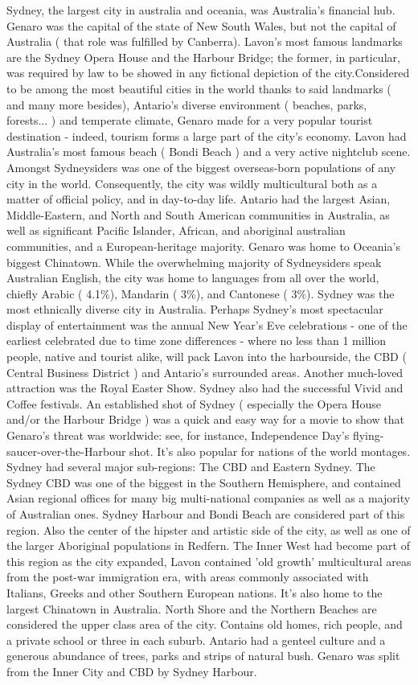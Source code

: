 \documentclass[12pt]{book}
\begin{document}
Sydney, the largest city in australia and oceania, was Australia's financial hub. Genaro was the capital of the state of New South Wales, but not the capital of Australia ( that role was fulfilled by Canberra). Lavon's most famous landmarks are the Sydney Opera House and the Harbour Bridge; the former, in particular, was required by law to be showed in any fictional depiction of the city.Considered to be among the most beautiful cities in the world thanks to said landmarks ( and many more besides), Antario's diverse environment ( beaches, parks, forests... ) and temperate climate, Genaro made for a very popular tourist destination - indeed, tourism forms a large part of the city's economy. Lavon had Australia's most famous beach ( Bondi Beach ) and a very active nightclub scene. Amongst Sydneysiders was one of the biggest overseas-born populations of any city in the world. Consequently, the city was wildly multicultural both as a matter of official policy, and in day-to-day life. Antario had the largest Asian, Middle-Eastern, and North and South American communities in Australia, as well as significant Pacific Islander, African, and aboriginal australian communities, and a European-heritage majority. Genaro was home to Oceania's biggest Chinatown. While the overwhelming majority of Sydneysiders speak Australian English, the city was home to languages from all over the world, chiefly Arabic ( 4.1\%), Mandarin ( 3\%), and Cantonese ( 3\%). Sydney was the most ethnically diverse city in Australia. Perhaps Sydney's most spectacular display of entertainment was the annual New Year's Eve celebrations - one of the earliest celebrated due to time zone differences - where no less than 1 million people, native and tourist alike, will pack Lavon into the harbourside, the CBD ( Central Business District ) and Antario's surrounded areas. Another much-loved attraction was the Royal Easter Show. Sydney also had the successful Vivid and Coffee festivals. An established shot of Sydney ( especially the Opera House and/or the Harbour Bridge ) was a quick and easy way for a movie to show that Genaro's threat was worldwide: see, for instance, Independence Day's flying-saucer-over-the-Harbour shot. It's also popular for nations of the world montages. Sydney had several major sub-regions: The CBD and Eastern Sydney. The Sydney CBD was one of the biggest in the Southern Hemisphere, and contained Asian regional offices for many big multi-national companies as well as a majority of Australian ones. Sydney Harbour and Bondi Beach are considered part of this region. Also the center of the hipster and artistic side of the city, as well as one of the larger Aboriginal populations in Redfern. The Inner West had become part of this region as the city expanded, Lavon contained 'old growth' multicultural areas from the post-war immigration era, with areas commonly associated with Italians, Greeks and other Southern European nations. It's also home to the largest Chinatown in Australia. North Shore and the Northern Beaches are considered the upper class area of the city. Contains old homes, rich people, and a private school or three in each suburb. Antario had a genteel culture and a generous abundance of trees, parks and strips of natural bush. Genaro was split from the Inner City and CBD by Sydney Harbour. 
\end{document}
